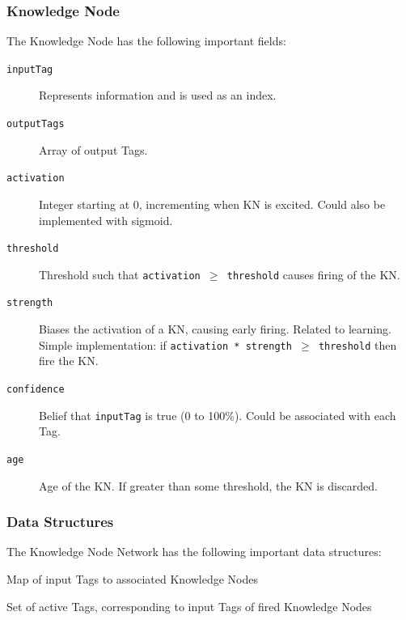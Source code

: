 \documentclass{beamer}
\newcommand{\code}[1]{\texttt{#1}}
\begin{document}
	\begin{frame}
		\frametitle{Knowledge Node}
		The Knowledge Node has the following important fields:
		\begin{description}
			\item[\code{inputTag}] Represents information and is used as an index.
			\item[\code{outputTags}] Array of output Tags.
			\item[\code{activation}] Integer starting at 0, incrementing when KN is excited. Could also be implemented with sigmoid.
			\item[\code{threshold}] Threshold such that \code{activation $\geq$ threshold} causes firing of the KN.
			\item[\code{strength}] Biases the activation of a KN, causing early firing. Related to learning. Simple implementation: if \code{activation * strength $\geq$ threshold} then fire the KN.
			\item[\code{confidence}] Belief that \code{inputTag} is true (0 to 100\%). Could be associated with each Tag.
			\item[\code{age}] Age of the KN. If greater than some threshold, the KN is discarded.
		\end{description}
	\end{frame}
	
	\begin{frame}
		\frametitle{Data Structures}
		The Knowledge Node Network has the following important data structures:
		\begin{description}[\code{activeTagsMETA}]
			\item[\code{mapKN}] Map of input Tags to associated Knowledge Nodes
			\item[\code{activeTags}] Set of active Tags, corresponding to input Tags of fired Knowledge Nodes
		\end{description}
	\end{frame}
\end{document}
